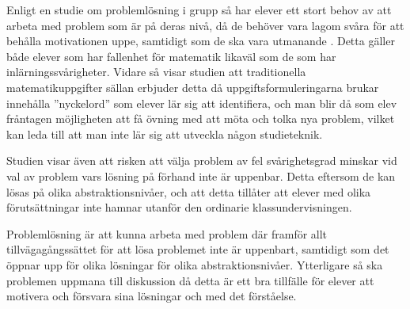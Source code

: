\textcolor{Mahogany}{Enligt en studie om problemlösning i grupp så har elever ett stort behov av att arbeta med problem som är på deras nivå, då de behöver vara lagom svåra för att behålla motivationen uppe, samtidigt som de ska vara utmanande \cite{undervisningviaproblemlosning}. Detta gäller både elever som har fallenhet för matematik likaväl som de som har inlärningssvårigheter. Vidare så visar studien att traditionella matematikuppgifter sällan erbjuder detta då uppgiftsformuleringarna brukar innehålla ''nyckelord'' som elever lär sig att identifiera, och man blir då som elev fråntagen möjligheten att få övning med att möta och tolka nya problem, vilket kan leda till att man inte lär sig att utveckla någon studieteknik.}

\textcolor{Mahogany}{Studien visar även att risken att välja problem av fel svårighetsgrad minskar vid val av problem vars lösning på förhand inte är uppenbar. Detta eftersom de kan lösas på olika abstraktionsnivåer, och att detta tillåter att elever med olika förutsättningar inte hamnar utanför den ordinarie klassundervisningen.}

\textcolor{Mahogany}{Problemlösning är att kunna arbeta med problem där framför allt tillvägagångssättet för att lösa problemet inte är uppenbart, samtidigt som det öppnar upp för olika lösningar för olika abstraktionsnivåer. Ytterligare så ska problemen uppmana till diskussion då detta är ett bra tillfälle för elever att motivera och försvara sina lösningar och med det förståelse.}